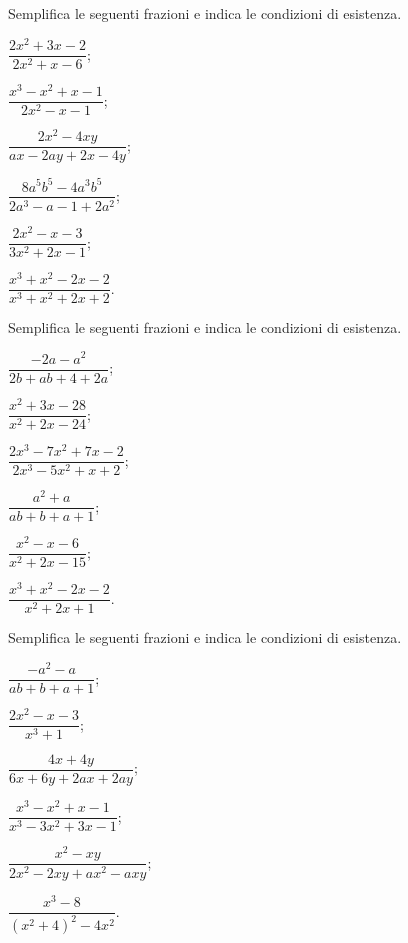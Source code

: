 \begin{esercizio}[\Ast]
\label{ese:19.9}
Semplifica le seguenti frazioni e indica le condizioni di esistenza.
\begin{multicols}{3}
\begin{enumeratea}
 \item $\dfrac{2x^{2}+3x-2}{2x^{2}+x-6}$;
 \item $\dfrac{x^{3}-x^{2}+x-1}{2x^{2}-x-1}$;
 \item $\dfrac{2x^{2}-4xy}{ax-2ay+2x-4y}$;
 \item $\dfrac{8a^{5}b^{5}-4a^{3}b^{5}}{2a^{3}-a-1+2a^{2}}$;
 \item $\dfrac{2x^{2}-x-3}{3x^{2}+2x-1}$;
 \item $\dfrac{x^{3}+x^{2}-2x-2}{x^{3}+x^{2}+2x+2}$.
\end{enumeratea}
\end{multicols}
\end{esercizio}

\begin{esercizio}[\Ast]
\label{ese:19.10}
Semplifica le seguenti frazioni e indica le condizioni di esistenza.
\begin{multicols}{3}
\begin{enumeratea}
 \item $\dfrac{-2a-a^{2}}{2b+ab+4+2a}$;
 \item $\dfrac{x^{2}+3x-28}{x^{2}+2x-24}$;
 \item $\dfrac{2x^{3}-7x^{2}+7x-2}{2x^{3}-5x^{2}+x+2}$;
 \item $\dfrac{a^{2}+a}{ab+b+a+1}$;
 \item $\dfrac{x^{2}-x-6}{x^{2}+2x-15}$;
 \item $\dfrac{x^{3}+x^{2}-2x-2}{x^{2}+2x+1}$.
\end{enumeratea}
\end{multicols}
\end{esercizio}

\begin{esercizio}[\Ast]
\label{ese:19.11}
Semplifica le seguenti frazioni e indica le condizioni di esistenza.
\begin{multicols}{3}
\begin{enumeratea}
 \item $\dfrac{-a^{2}-a}{ab+b+a+1}$;
 \item $\dfrac{2x^{2}-x-3}{x^{3}+1}$;
 \item $\dfrac{4x+4y}{6x+6y+2ax+2ay}$;
 \item $\dfrac{x^{3}-x^{2}+x-1}{x^{3}-3x^{2}+3x-1}$;
 \item $\dfrac{x^{2}-xy}{2x^{2}-2xy+ax^{2}-axy}$;
 \item $\dfrac{x^{3}-8}{\left(x^{2}+4\right)^{2}-4x^{2}}$.
\end{enumeratea}
\end{multicols}
\end{esercizio}

